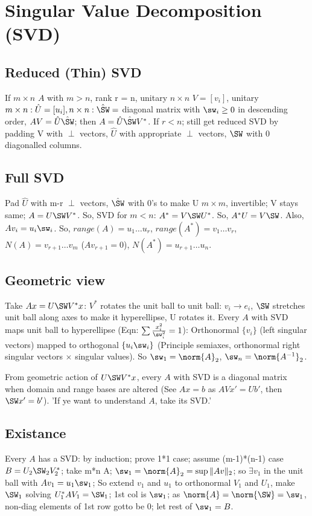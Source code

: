 \documentclass[oneside, article]{memoir}
\begin{document}
\section{Singular Value Decomposition (SVD)}

\subsection{Reduced (Thin) SVD}
If $m\times n$ $A$ with $m>n$, rank r = n, unitary $n\times n$ $V = [v_{i}]$, unitary $m\times n: \hat{U}=[u_{i}], n\times n: \hat{\SW} = $ diagonal matrix with ${\sw_{i} \geq 0}$ in descending order, $AV=\hat{U}\hat{\SW}$; then $A=\hat{U}\hat{\SW}V^{*}$. If $r<n$; still get reduced SVD by padding V with $\perp$ vectors, $\hat{U}$ with appropriate $\perp$ vectors, $\SW$ with 0 diagonalled columns.

\subsection{Full SVD}
Pad $\hat{U}$ with m-r $\perp$ vectors, $\hat{\SW}$ with 0's to make U $m \times m$, invertible; V stays same; $A=U\SW V^{*}$. So, SVD for $m<n$: $A^{*}=V\SW U^{*}$. So, $A^{*}U=V\SW$. Also, $Av_{i} = u_{i}\sw_{i}$. So, $range(A)=u_{1} \dots u_{r}$, $range(A^{*})=v_{1} \dots v_{r}$, $N(A)=v_{r+1} \dots v_{m}$ ($Av_{r+1}=0$), $N(A^{*})=u_{r+1} \dots u_{n}$.

\subsection{Geometric view}
Take $Ax = U\SW V^{*}x$: $V^{*}$ rotates the unit ball to unit ball: $v_{i} \to e_{i}$, $\SW$ stretches unit ball along axes to make it hyperellipse, U rotates it. Every $A$ with SVD maps unit ball to hyperellipse (Eqn: $\sum \frac{x_{i}^{2}}{\sw_{i}^{2}} = 1$): Orthonormal $\{v_{i}\}$ (left singular vectors) mapped to orthogonal $\{u_{i}\sw_{i}\}$ (Principle semiaxes, orthonormal right singular vectors $\times$ singular values). So $\sw_{1} = \norm{A}_{2}$, $\sw_{n} = \norm{A^{-1}}_{2}$.

From geometric action of $U\SW V^{*}x$, every $A$ with SVD is a diagonal matrix when domain and range bases are altered (See $Ax=b$ as $AVx'=Ub'$, then $\SW x'=b'$). 'If ye want to understand $A$, take its SVD.'

\subsection{Existance}
Every $A$ has a SVD: by induction; prove 1*1 case; assume (m-1)*(n-1) case  $B=U_{2}\SW_{2}V_{2}^{*}$; take m*n A; $\sw_{1} = \norm{A}_{2} = \sup \|Av\|_{2}$; so $\exists v_{1}$ in the unit ball with $Av_{1} = u_{1}\sw_{1}$; So extend $v_{1}$ and $u_{1}$ to orthonormal $V_{1}$ and $U_{1}$, make $\SW_{1}$ solving $U_{1}^{*}AV_{1}=\SW_{1}$; 1st col is $\sw_{1}$; as $\norm{A}=\norm{\SW} = \sw_{1}$, non-diag elements of 1st row gotto be 0; let rest of $\sw_{1}=B$.
\end{document}
